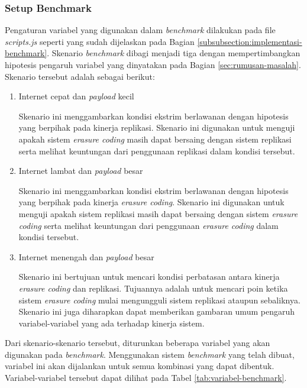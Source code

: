 \subsubsection{Setup Benchmark}
\label{subsubsection:setup-benchmark}

Pengaturan variabel yang digunakan dalam \textit{benchmark} dilakukan pada file \textit{scripts.js} seperti yang sudah dijelaskan pada Bagian \ref{subsubsection:implementasi-benchmark}. Skenario \textit{benchmark} dibagi menjadi tiga dengan mempertimbangkan hipotesis pengaruh variabel yang dinyatakan pada Bagian \ref{sec:rumusan-masalah}. Skenario tersebut adalah sebagai berikut:

\begin{enumerate}
  \item Internet cepat dan \textit{payload} kecil
  
  Skenario ini menggambarkan kondisi ekstrim berlawanan dengan hipotesis yang berpihak pada kinerja replikasi. Skenario ini digunakan untuk menguji apakah sistem \textit{erasure coding} masih dapat bersaing dengan sistem replikasi serta melihat keuntungan dari penggunaan replikasi dalam kondisi tersebut. 

  \item Internet lambat dan \textit{payload} besar
  
  Skenario ini menggambarkan kondisi ekstrim berlawanan dengan hipotesis yang berpihak pada kinerja \textit{erasure coding}. Skenario ini digunakan untuk menguji apakah sistem replikasi masih dapat bersaing dengan sistem \textit{erasure coding} serta melihat keuntungan dari penggunaan \textit{erasure coding} dalam kondisi tersebut.

  \item Internet menengah dan \textit{payload} besar
  
  Skenario ini bertujuan untuk mencari kondisi perbatasan antara kinerja \textit{erasure coding} dan replikasi. Tujuannya adalah untuk mencari poin ketika sistem \textit{erasure coding} mulai mengungguli sistem replikasi ataupun sebaliknya. Skenario ini juga diharapkan dapat memberikan gambaran umum pengaruh variabel-variabel yang ada terhadap kinerja sistem.
  
\end{enumerate}

Dari skenario-skenario tersebut, diturunkan beberapa variabel yang akan digunakan pada \textit{benchmark}. Menggunakan sistem \textit{benchmark} yang telah dibuat, variabel ini akan dijalankan untuk semua kombinasi yang dapat dibentuk. Variabel-variabel tersebut dapat dilihat pada Tabel \ref{tab:variabel-benchmark}.

